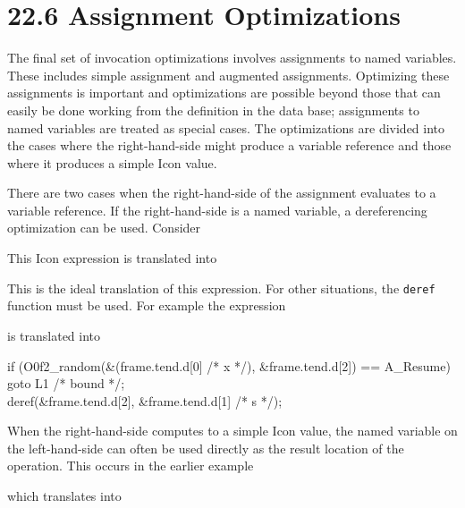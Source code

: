 \section[22.6 Assignment Optimizations]{22.6 Assignment Optimizations}

The final set of invocation optimizations involves assignments to
named variables. These includes simple assignment and augmented
assignments. Optimizing these assignments is important and
optimizations are possible beyond those that can easily be done
working from the definition in the data base; assignments to named
variables are treated as special cases. The optimizations are divided
into the cases where the right-hand-side might produce a variable
reference and those where it produces a simple Icon value.

There are two cases when the right-hand-side of the assignment
evaluates to a variable reference. If the right-hand-side is a named
variable, a dereferencing optimization can be used. Consider


\noindent This Icon expression is translated into 


\noindent
This is the ideal translation of this expression. For other
situations, the \texttt{deref} function must be used. For example the
expression


\noindent is translated into 

\goodbreak
\begin{iconcode}
\>if (O0f2\_random(\&(frame.tend.d[0] /* x */), \&frame.tend.d[2]) == A\_Resume)\\
\>\>goto L1 /* bound */;\\
\>deref(\&frame.tend.d[2], \&frame.tend.d[1] /* s */);\\
\end{iconcode}


When the right-hand-side computes to a simple Icon value, the named
variable on the left-hand-side can often be used directly as the
result location of the operation. This occurs in the earlier example


\noindent which translates into


